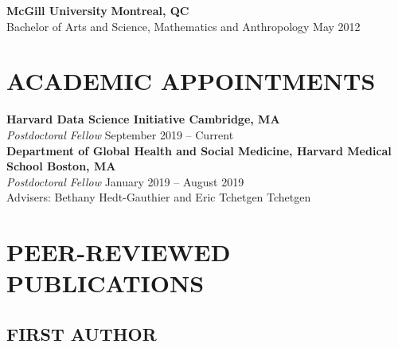 \documentclass[12pt]{article}
\begin{document}
\textbf{McGill University} \hfill \hfill \textbf{Montreal, QC} \\
Bachelor of Arts and Science, Mathematics and Anthropology  \hfill \hfill May 2012 


\section*{\textbf{{\large A}CADEMIC {\large A}PPOINTMENTS }}

\textbf{Harvard Data Science Initiative \hfill \hfill Cambridge, MA} \\
\textit{Postdoctoral Fellow}  \hfill \hfill September 2019 -- Current \\

\textbf{Department of Global Health and Social Medicine, Harvard Medical School \hfill \hfill Boston, MA} \\
\textit{Postdoctoral Fellow} \hfill \hfill January 2019 -- August 2019 \\
Advisers: Bethany Hedt-Gauthier and Eric Tchetgen Tchetgen 

\section*{\textbf{{\large P}{EER}-{\large R}{EVIEWED} {\large P}{UBLICATIONS}}}

\subsection*{\textbf{FIRST AUTHOR}}
\end{document}
